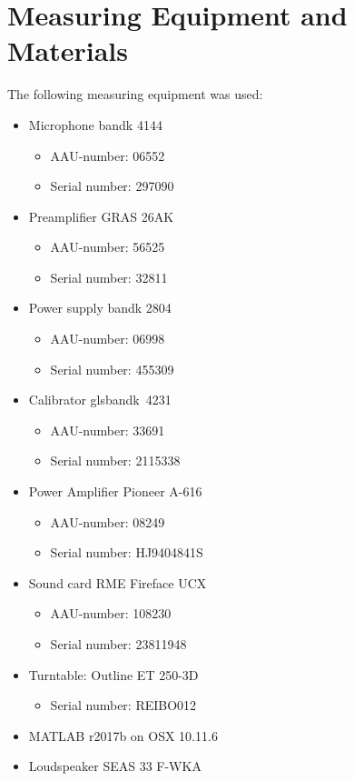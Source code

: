 \section*{Measuring Equipment and Materials}
The following measuring equipment was used:
\begin{itemize}[noitemsep]
\item Microphone \gls{bandk} 4144
\begin{itemize}[noitemsep]
\item AAU-number: 06552
\item Serial number: 297090
\end{itemize}
\item Preamplifier GRAS 26AK
\begin{itemize}[noitemsep]
\item AAU-number: 56525
\item Serial number: 32811
\end{itemize}
\item Power supply \gls{bandk} 2804
\begin{itemize}
\item AAU-number: 06998
\item Serial number: 455309
\end{itemize}
\item Calibrator gls{bandk}\ 4231
\begin{itemize}[noitemsep]
\item AAU-number: 33691
\item Serial number: 2115338
\end{itemize}
\item Power Amplifier Pioneer A-616
\begin{itemize}[noitemsep]
\item AAU-number: 08249
\item Serial number: HJ9404841S
\end{itemize}
\item Sound card RME Fireface UCX
\begin{itemize}[noitemsep]
\item AAU-number: 108230
\item Serial number: 23811948
\end{itemize}
\item Turntable: Outline ET 250-3D
\begin{itemize}
\item Serial number: REIBO012
\end{itemize}
\item MATLAB r2017b on OSX 10.11.6
\item Loudspeaker SEAS 33 F-WKA
\end{itemize}


